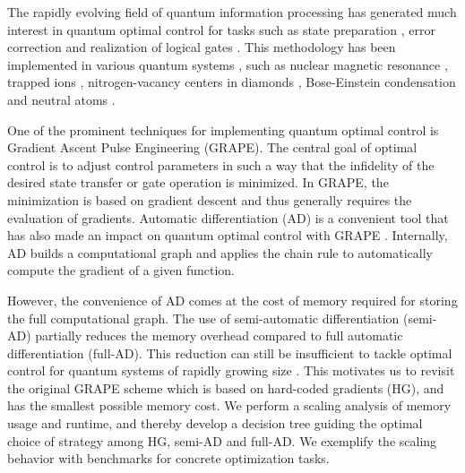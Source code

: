\documentclass[12pt]{article}
\begin{document}
The rapidly evolving field of quantum information processing has generated much interest in quantum optimal control for tasks such as state preparation  \cite{rojan2014arbitrarystate,bondar2023globally}, error correction \cite{waldherr2014quantumerror,gertler2021protecting} and realization of logical gates \cite{scabdelhafez2020universal,scallen2017optimal,schuang2014optimal,scwerninghaus2021leakage}. This methodology has been implemented in various quantum systems \cite{glaser2015training}, such as nuclear magnetic resonance \cite{nmrbretschneider2012conversion,nmrkehlet2004improving,nmrkhaneja2005optimal,nmrsimon2009optimal,nmrspinachhogben2011spinach,nmrxu2008designing}, trapped ions \cite{timuller2015phonon,tinebendahl2009optimal}, nitrogen-vacancy centers in diamonds \cite{nvangerer2013robust,nvchou2015optimal,nvdolde2014high,nvpoggiali2018optimal,nvpoulsen2021optimal,nvrembold2020introduction,nvyan2021population}, Bose-Einstein condensation  \cite{becamri2019optimal,becmennemann2015optimal,becsorensen2018qengine} and neutral atoms \cite{atomguo2019high,atomrosi2013fast}. 

One of the prominent techniques for implementing quantum optimal control is Gradient Ascent Pulse Engineering (GRAPE). The central goal of optimal control is to adjust control parameters in such a way that the infidelity of the desired state transfer or gate operation is minimized. In GRAPE, the minimization is based on gradient descent and thus generally requires the evaluation of gradients. Automatic differentiation (AD) \cite{baydin2018automatic} is a convenient tool that has also made an impact on quantum optimal control with GRAPE \cite{pacleung2017speedup,pacqoc,abdelhafez2019gradient,grapead}.
Internally, AD builds a computational graph and applies the chain rule to automatically compute the gradient of a given function. 

However, the convenience of AD comes at the cost of memory required for storing the full computational graph. The use of semi-automatic differentiation (semi-AD) \cite{semiadgoerz2022quantum} partially reduces the memory overhead compared to full automatic differentiation (full-AD). This reduction can still be insufficient to tackle optimal control for quantum systems of rapidly growing size \cite{arute2019quantum,gong2021quantum}. This motivates us to revisit the original GRAPE scheme \cite{nmrkhaneja2005optimal} which is based on hard-coded gradients (HG), and has the smallest possible memory cost. We perform a scaling analysis of memory usage and runtime, and thereby develop a decision tree guiding the optimal choice of strategy among HG, semi-AD and full-AD. We exemplify the scaling behavior with benchmarks for concrete optimization tasks.
\end{document}
